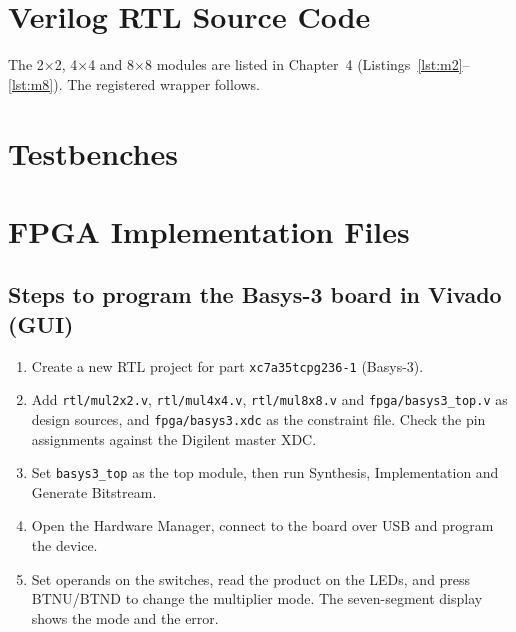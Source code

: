 \documentclass[12pt,a4paper,oneside]{report}
\begin{document}



\appendix

\chapter{Verilog RTL Source Code}
\label{app:rtl}
The 2$\times$2, 4$\times$4 and 8$\times$8 modules are listed in Chapter~4 (Listings~\ref{lst:m2}--\ref{lst:m8}). The registered wrapper follows.


\chapter{Testbenches}
\label{app:tb}



\chapter{FPGA Implementation Files}
\label{app:fpga}




\section*{Steps to program the Basys-3 board in Vivado (GUI)}
\begin{enumerate}
\item Create a new RTL project for part \texttt{xc7a35tcpg236-1} (Basys-3).
\item Add \texttt{rtl/mul2x2.v}, \texttt{rtl/mul4x4.v}, \texttt{rtl/mul8x8.v} and \texttt{fpga/basys3\_top.v} as design sources, and \texttt{fpga/basys3.xdc} as the constraint file. Check the pin assignments against the Digilent master XDC.
\item Set \texttt{basys3\_top} as the top module, then run Synthesis, Implementation and Generate Bitstream.
\item Open the Hardware Manager, connect to the board over USB and program the device.
\item Set operands on the switches, read the product on the LEDs, and press BTNU/BTND to change the multiplier mode. The seven-segment display shows the mode and the error.
\end{enumerate}
\end{document}
